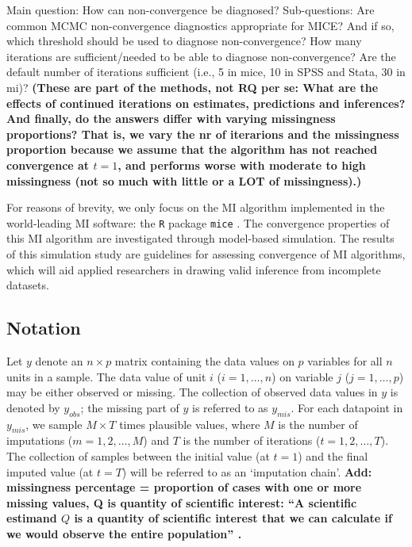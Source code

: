 \documentclass[Royal,times,sageh]{sagej}
\begin{document}
Main question: How can non-convergence be diagnosed? Sub-questions: Are
common MCMC non-convergence diagnostics appropriate for MICE? And if so,
which threshold should be used to diagnose non-convergence? How many
iterations are sufficient/needed to be able to diagnose non-convergence?
Are the default number of iterations sufficient (i.e., 5 in mice, 10 in
SPSS and Stata, 30 in mi)? \textbf{(These are part of the methods, not
RQ per se: What are the effects of continued iterations on estimates,
predictions and inferences? And finally, do the answers differ with
varying missingness proportions? That is, we vary the nr of iterarions
and the missingness proportion because we assume that the algorithm has
not reached convergence at \(t=1\), and performs worse with moderate to
high missingness (not so much with little or a LOT of missingness).)}

For reasons of brevity, we only focus on the MI algorithm implemented in
the world-leading MI software: the \texttt{R} \citep{R} package
\texttt{mice} \citep{mice}. The convergence properties of this MI
algorithm are investigated through model-based simulation. The results
of this simulation study are guidelines for assessing convergence of MI
algorithms, which will aid applied researchers in drawing valid
inference from incomplete datasets.

\hypertarget{notation}{%
\subsection{Notation}\label{notation}}

Let \(y\) denote an \(n \times p\) matrix containing the data values on
\(p\) variables for all \(n\) units in a sample. The data value of unit
\(i\) (\(i = 1, \dots, n\)) on variable \(j\) (\(j = 1, \dots, p\)) may
be either observed or missing. The collection of observed data values in
\(y\) is denoted by \(y_{obs}\); the missing part of \(y\) is referred
to as \(y_{mis}\). For each datapoint in \(y_{mis}\), we sample
\(M \times T\) times plausible values, where \(M\) is the number of
imputations (\(m = 1, 2, \dots, M\)) and \(T\) is the number of
iterations (\(t = 1, 2, \dots, T\)). The collection of samples between
the initial value (at \(t=1\)) and the final imputed value (at \(t=T\))
will be referred to as an `imputation chain'. \textbf{Add: missingness
percentage = proportion of cases with one or more missing values, Q is
quantity of scientific interest: ``A scientific estimand \(Q\) is a
quantity of scientific interest that we can calculate if we would
observe the entire population'' \citep[par 2.3.1]{buur18}. }
\end{document}

